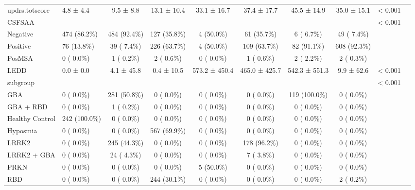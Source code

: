 \documentclass[
  table]{article}
\begin{document}
\begin{table}
\begin{center}
\begin{small}
\begin{tabular}{llccccccrr}
updrs.totscore     & 4.8 ±  4.4& 9.5 ±  8.8&13.1 ± 10.4&33.1 ± 16.7&37.4 ± 17.7&45.5 ± 14.9&35.0 ± 15.1&< 0.001\\ 
CSFSAA             &&&&&&&&< 0.001\\ 
 \hspace{0.5cm} Negative       &474 (86.2\%)&484 (92.4\%)&127 (35.8\%)&4 (50.0\%)&61 (35.7\%)&6 ( 6.7\%)&49 ( 7.4\%)&\\ 
 \hspace{0.5cm} Positive       &76 (13.8\%)&39 ( 7.4\%)&226 (63.7\%)&4 (50.0\%)&109 (63.7\%)&82 (91.1\%)&608 (92.3\%)&\\ 
 \hspace{0.5cm} PosMSA         & 0 ( 0.0\%)&1 ( 0.2\%)&2 ( 0.6\%)& 0 ( 0.0\%)&1 ( 0.6\%)&2 ( 2.2\%)&2 ( 0.3\%)&\\ 
LEDD               & 0.0 ±  0.0& 4.1 ± 45.8& 0.4 ± 10.5&573.2 ± 450.4&465.0 ± 425.7&542.3 ± 551.3& 9.9 ± 62.6&< 0.001\\ 
subgroup           &&&&&&&&< 0.001\\ 
 \hspace{0.5cm} GBA            & 0 ( 0.0\%)&281 (50.8\%)& 0 ( 0.0\%)& 0 ( 0.0\%)& 0 ( 0.0\%)&119 (100.0\%)& 0 ( 0.0\%)&\\ 
 \hspace{0.5cm} GBA + RBD      & 0 ( 0.0\%)&1 ( 0.2\%)& 0 ( 0.0\%)& 0 ( 0.0\%)& 0 ( 0.0\%)& 0 ( 0.0\%)& 0 ( 0.0\%)&\\ 
 \hspace{0.5cm} Healthy Control&242 (100.0\%)& 0 ( 0.0\%)& 0 ( 0.0\%)& 0 ( 0.0\%)& 0 ( 0.0\%)& 0 ( 0.0\%)& 0 ( 0.0\%)&\\ 
 \hspace{0.5cm} Hyposmia       & 0 ( 0.0\%)& 0 ( 0.0\%)&567 (69.9\%)& 0 ( 0.0\%)& 0 ( 0.0\%)& 0 ( 0.0\%)& 0 ( 0.0\%)&\\ 
 \hspace{0.5cm} LRRK2          & 0 ( 0.0\%)&245 (44.3\%)& 0 ( 0.0\%)& 0 ( 0.0\%)&178 (96.2\%)& 0 ( 0.0\%)& 0 ( 0.0\%)&\\ 
 \hspace{0.5cm} LRRK2 + GBA    & 0 ( 0.0\%)&24 ( 4.3\%)& 0 ( 0.0\%)& 0 ( 0.0\%)&7 ( 3.8\%)& 0 ( 0.0\%)& 0 ( 0.0\%)&\\ 
 \hspace{0.5cm} PRKN           & 0 ( 0.0\%)& 0 ( 0.0\%)& 0 ( 0.0\%)&5 (50.0\%)& 0 ( 0.0\%)& 0 ( 0.0\%)& 0 ( 0.0\%)&\\ 
 \hspace{0.5cm} RBD            & 0 ( 0.0\%)& 0 ( 0.0\%)&244 (30.1\%)& 0 ( 0.0\%)& 0 ( 0.0\%)& 0 ( 0.0\%)&2 ( 0.2\%)&\\ 

\end{tabular}
\end{small}
\end{center}
\end{table}
\end{document}
